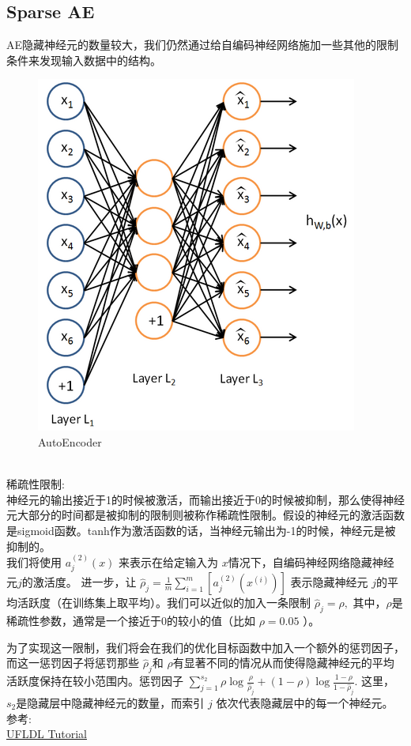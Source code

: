 \documentclass{article}
\begin{document}
\subsection{Sparse AE}
AE隐藏神经元的数量较大，我们仍然通过给自编码神经网络施加一些其他的限制条件来发现输入数据中的结构。\\
\begin{figure}[h]
\centering
\includegraphics[height=0.5\linewidth]{4.png}
\caption{AutoEncoder}
\end{figure}\\
稀疏性限制:\\
神经元的输出接近于1的时候被激活，而输出接近于0的时候被抑制，那么使得神经元大部分的时间都是被抑制的限制则被称作稀疏性限制。假设的神经元的激活函数是sigmoid函数。tanh作为激活函数的话，当神经元输出为-1的时候，神经元是被抑制的。\\
我们将使用 $\textstyle a^{(2)}_j(x)$ 来表示在给定输入为 $\textstyle x $情况下，自编码神经网络隐藏神经元$ \textstyle j $的激活度。 进一步，让
$\hat\rho_j = \frac{1}{m} \sum_{i=1}^m \left[ a^{(2)}_j(x^{(i)}) \right]$
表示隐藏神经元 $\textstyle j $的平均活跃度（在训练集上取平均）。我们可以近似的加入一条限制
$\hat\rho_j = \rho,$
其中，$ \textstyle \rho$是稀疏性参数，通常是一个接近于0的较小的值（比如 $\textstyle \rho = 0.05$ ）。

为了实现这一限制，我们将会在我们的优化目标函数中加入一个额外的惩罚因子，而这一惩罚因子将惩罚那些 $\textstyle \hat\rho_j $和 $\textstyle \rho $有显著不同的情况从而使得隐藏神经元的平均活跃度保持在较小范围内。惩罚因子
$
\sum_{j=1}^{s_2} \rho \log \frac{\rho}{\hat\rho_j} + (1-\rho) \log \frac{1-\rho}{1-\hat\rho_j}.
$
这里， $\textstyle s_2 $是隐藏层中隐藏神经元的数量，而索引 $\textstyle j$ 依次代表隐藏层中的每一个神经元。
\\
参考:\\
\href{http://deeplearning.stanford.edu/wiki/index.php/Autoencoders_and_Sparsity}{UFLDL Tutorial}
\end{document}
